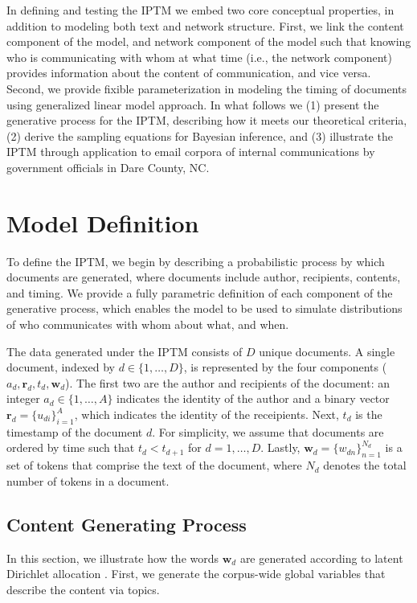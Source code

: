 \documentclass[twoside]{article}
\begin{document}
In defining and testing the IPTM we embed two core conceptual properties, in addition to modeling both text and network structure. First, we link the content component of the model, and network component of the model such that knowing who is communicating with whom at what time (i.e., the network component) provides information about the content of communication, and vice versa. Second, we provide fixible parameterization in modeling the timing of documents using generalized linear model approach. In what follows we (1) present the generative process for the IPTM, describing how it meets our theoretical criteria, (2) derive the sampling equations for Bayesian inference, and (3) illustrate the IPTM through application to email corpora of internal communications by government officials in Dare County, NC. 

\section{Model Definition}
To define the IPTM, we begin by describing a probabilistic process by which documents are generated, where documents include author, recipients, contents, and timing. We provide a fully parametric definition of each component of the generative process, which enables the model to be used to simulate distributions of who communicates with whom about what, and when.

The data generated under the IPTM consists of $D$ unique documents. A single document, indexed by $d \in \{1,\ldots,D\}$, is represented by the four components ($a_d, \boldsymbol{r}_d, t_d,  \boldsymbol{w}_d$). The first two are the author and recipients of the document: an integer $a_d \in \{1,\ldots,A\}$ indicates the identity of the author and a binary vector $\boldsymbol{r}_d = \{u_{di} \}_{i=1}^{A}$, which indicates the identity of the receipients. Next, $t_d$ is the timestamp of the document $d$. For simplicity, we assume that documents are ordered by time such that $t_d < t_{d+1}$ for $d=1, \ldots, D$. Lastly, $ \boldsymbol{w}_d= \{w_{dn} \}_{n=1}^{N_d}$ is a set of tokens that comprise the text of the document, where $N_d$ denotes the total number of tokens in a document.

\subsection{Content Generating Process}\label{subsec:Content generating process}

In this section, we illustrate how the words $\boldsymbol{w}_d$ are generated according to latent Dirichlet allocation \citep{Blei2003}. First, we generate the corpus-wide global variables that describe the content via topics. 
\end{document}
